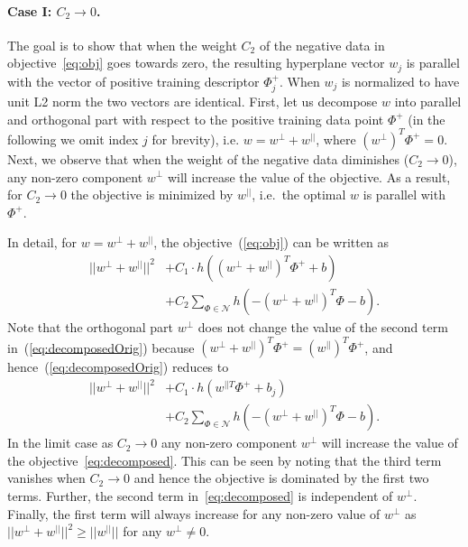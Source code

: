       \paragraph{Case I: $C_2\rightarrow 0$.}
         The goal is to show that when the weight  $C_2$ of the negative data in objective~\eqref{eq:obj} goes towards zero, the resulting hyperplane vector $w_j$ is parallel with the vector of positive training descriptor $\Phi_j^+$. When $w_j$ is normalized to have unit L2 norm the two vectors are identical. First, let us decompose $w$ into parallel and orthogonal part with respect to the positive training data point $\Phi^+$ (in the following we omit index $j$ for brevity), i.e. $w=w^{\perp}+w^{||}$, where $(w^{\perp})^T \Phi^+ = 0$. Next, we observe that when the weight of the negative data diminishes ($C_2\rightarrow 0$), any non-zero component $w^{\perp}$ will increase the value of the objective. As a result, for $C_2\rightarrow 0$ the objective is minimized by $w^{||}$, i.e.\ the optimal $w$ is parallel with $\Phi^+$.

         In detail, for $w=w^{\perp}+w^{||}$, the objective~(\ref{eq:obj}) can be written as
         \begin{align}
            \label{eq:decomposedOrig}
              ||w^{\perp}+w^{||}||^{2} &+
              C_1 \cdot h
              \left(
               (w^{\perp}+w^{||})^T\Phi^+ + b
              \right) \\ \nonumber
              &+
              C_2\sum_{\Phi\in \mathcal N} h
              \left(
               -(w^{\perp}+w^{||})^T\Phi-b
              \right).
         \end{align}
         Note that the orthogonal part $w^{\perp}$ does not change the value of  the second term in~(\ref{eq:decomposedOrig}) because $(w^{\perp}+w^{||})^T\Phi^+=(w^{||})^T\Phi^+$, and hence~(\ref{eq:decomposedOrig}) reduces to
         \begin{align} 
            \label{eq:decomposed} 
            ||w^{\perp}+w^{||}||^{2} &+
            C_1 \cdot h
            \left(
                w^{||T}\Phi^+ +b_j
            \right) \\ \nonumber
            &+
            C_2\sum_{\Phi\in \mathcal N} h
            \left(
                -(w^{\perp}+w^{||})^T\Phi-b
            \right).
         \end{align}
         In the limit case as $C_2 \rightarrow 0$ any non-zero component $w^{\perp}$
         will increase the value of the objective~\eqref{eq:decomposed}. This can be seen by noting that the third term vanishes when $C_2 \rightarrow 0$ and hence the objective is dominated by the first two terms. Further, the second term in~\eqref{eq:decomposed} is independent of $w^{\perp}$. Finally, the first term will always increase for any non-zero value of $w^{\perp}$ as $||w^{\perp}+w^{||}||^{2} \geq ||w^{||}||$ for any $w^{\perp}\neq0$.

